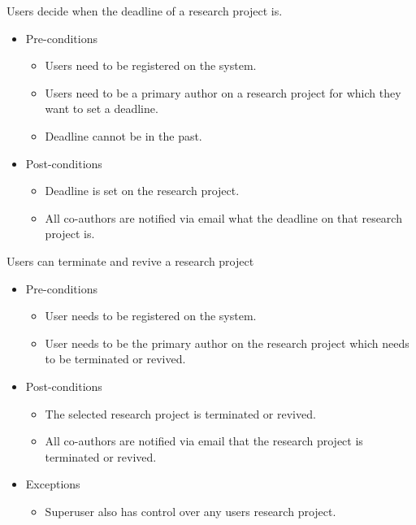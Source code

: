 \documentclass[a4paper,12pt]{report}
\begin{document}
	Users decide when the deadline of a research project is.
	\begin{itemize}
		\item Pre-conditions
			\begin{itemize}
				\item Users need to be registered on the system.
				\item Users need to be a primary author on a research project for which they want to set a deadline.
				\item Deadline cannot be in the past.
			\end{itemize}
		\item Post-conditions
			\begin{itemize}
				\item Deadline is set on the research project.
				\item All co-authors are notified via email what the deadline on that research project is.
			\end{itemize}
	\end{itemize}

	Users can terminate and revive a research project
	\begin{itemize}
		\item Pre-conditions
			\begin{itemize}
				\item User needs to be registered on the system.
				\item User needs to be the primary author on the research project which needs to be terminated or revived.
			\end{itemize}
		\item Post-conditions
			\begin{itemize}
				\item The selected research project is terminated or revived.
				\item All co-authors are notified via email that the research project is terminated or revived.
			\end{itemize}
		\item Exceptions
			\begin{itemize}
				\item Superuser also has control over any users research project.
			\end{itemize}
	\end{itemize}
\end{document}
